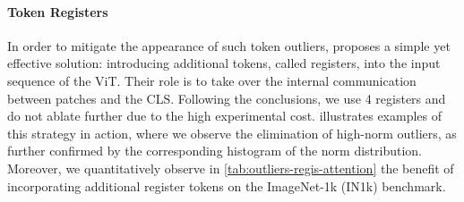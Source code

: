 \paragraph{Token Registers} 
In order to mitigate the appearance of such token outliers, \citep{darcet2024vision} proposes a simple yet effective solution: introducing additional tokens, called registers, into the input sequence of the ViT. 
Their role is to take over the internal communication between patches and the CLS. 
Following the conclusions, we use 4 registers and do not ablate further due to the high experimental cost.
 illustrates examples of this strategy in action, where we observe the elimination of high-norm outliers, as further confirmed by the corresponding histogram of the norm distribution. 
Moreover, we quantitatively observe in \cref{tab:outliers-regis-attention} the benefit of incorporating additional register tokens on the ImageNet-1k (IN1k) benchmark.


